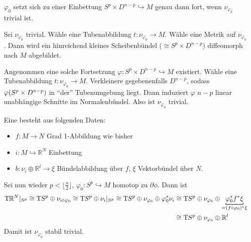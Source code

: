 \begin{lemma}
	$\varphi_0$ setzt sich zu einer Einbettung $S^p \times D^{n-p} \hookrightarrow M$ genau dann fort, wenn $\nu_{\varphi_0}$ trivial ist.
\end{lemma}
\begin{beweis}
	Sei $\nu_{\varphi_0}$ trivial.
	Wähle eine Tubenabbildung $t \colon \nu_{\varphi_0} \to M$.
	Wähle eine Metrik auf $\nu_{\varphi_0}$.
	Dann wird ein hinreichend kleines Scheibenbündel ($\cong S^p \times D^{n-p}$) diffeomorph nach $M$ abgebildet.
	
	Angenommen eine solche Fortsetzung $\varphi \colon S^p \times D^{n-p} \hookrightarrow M$ existiert.
	Wähle eine Tubenabbildung $t \colon \nu_{\varphi_0} \to M$.
	Verkleinere gegebenenfalls $D^{n-p}$, sodass $\varphi \enbrace*{S^p \times D^{n-p}}$ in \enquote{der} Tubenumgebung liegt.
	Dann induziert $\varphi$ $n-p$ linear unabhängige Schnitte im Normalenbündel.
	Also ist $\nu_{\varphi_0}$ trivial.
\end{beweis}

\begin{definition}
	Eine  besteht aus folgenden Daten:
	\begin{itemize}[itemsep=1pt]
		\item $f \colon M \to N$ Grad 1-Abbildung wie bisher
		\item $i \colon M \hookrightarrow \mathbb{R}^N$ Einbettung
		\item $b \colon \nu_i \oplus \mathbb{R}^l \to \xi$ Bündelabbildung über $f$, $\xi$ Vektorbündel über $N$.
	\end{itemize} 
\end{definition}

Sei nun wieder $p < \lfloor \frac{n}{2}\rfloor$, $\varphi_0 \colon S^p \hookrightarrow M$ homotop zu $\partial \phi$.
Dann ist
\begin{align}
	\Tmap \mathbb{R}^N|_{S^p} \cong \Tmap S^p \oplus \nu_{i \circ \varphi_0} \cong \Tmap S^p \oplus \nu_i|_{S^p} \cong \Tmap S^p \oplus \nu_{\varphi_0} \oplus \varphi_0^* \nu_i &\cong \Tmap S^p \oplus \nu_{\varphi_0} \oplus \Underbracket{\varphi_0^* f^* \xi}{=(f \circ \varphi_0)^* \xi} \\
	&\cong \Tmap S^p \oplus \nu_{\varphi_0} \oplus \mathbb{R}^l
\end{align}
Damit ist $\nu_{\varphi_0}$ stabil trivial.

